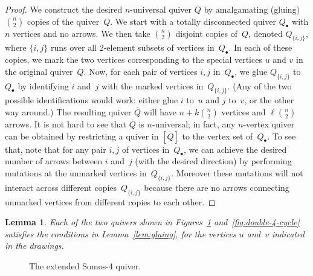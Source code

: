 \documentclass[10pt]{amsart}
\newtheorem{lemma}[theorem]{Lemma}
\theoremstyle{definition}
\begin{document}
\begin{proof}
We construct the desired $n$-universal quiver $\overline Q$ by amalgamating (gluing) $\binom{n}{2}$ copies of the quiver~$Q$. 
We start with a totally disconnected quiver $Q_\bullet$ with $n$ vertices and no arrows. 
We then take $\binom{n}{2}$ disjoint copies of~$Q$, denoted $Q_{\{i,j\}}$, where $\{i,j\}$ runs over all $2$-element subsets of vertices in~$Q_\bullet$. 
In each of these copies, we mark the two vertices corresponding to the special vertices $u$ and $v$ in the original quiver~$Q$. 
Now, for each pair of vertices $i,j$ in~$Q_\bullet$, we glue $Q_{\{i,j\}}$ to~$Q_\bullet$ by identifying $i$ and~$j$ with the marked vertices in~$Q_{\{i,j\}}$. (Any of the two possible identifications would work: either glue $i$ to~$u$ and $j$ to~$v$, or the other way around.) The resulting quiver $\overline Q$ will have $n+k\binom{n}{2}$ vertices and $\ell\binom{n}{2}$ arrows. It is not hard to see that $\overline Q$ is \hbox{$n$-universal}; in fact, any $n$-vertex quiver can be obtained by restricting a quiver in $[\overline Q]$ to the vertex set of~$Q_\bullet$. To see that, note that for any pair $i,j$ of vertices in~$Q_\bullet$, we can achieve the desired number of arrows between $i$ and~$j$ (with the desired direction) by performing mutations at the unmarked vertices in~$Q_{\{i,j\}}$. Moreover these mutations will not interact across different copies~$Q_{\{i,j\}}$ because there are no arrows connecting unmarked vertices from different copies to each other. 
\end{proof}


\begin{lemma}
\label{lem:6-vertex-quivers}
Each of the two quivers shown in Figures~\ref{fig:extended-somos-4}
and~\ref{fig:double-4-cycle}
satisfies the conditions in Lemma~\ref{lem:gluing}, for the vertices $u$ and~$v$ indicated in the drawings. 
\end{lemma}

\begin{figure}[ht]\centering
{}
\caption{The extended Somos-4 quiver.}
\label{fig:extended-somos-4}
\end{figure}
\end{document}
